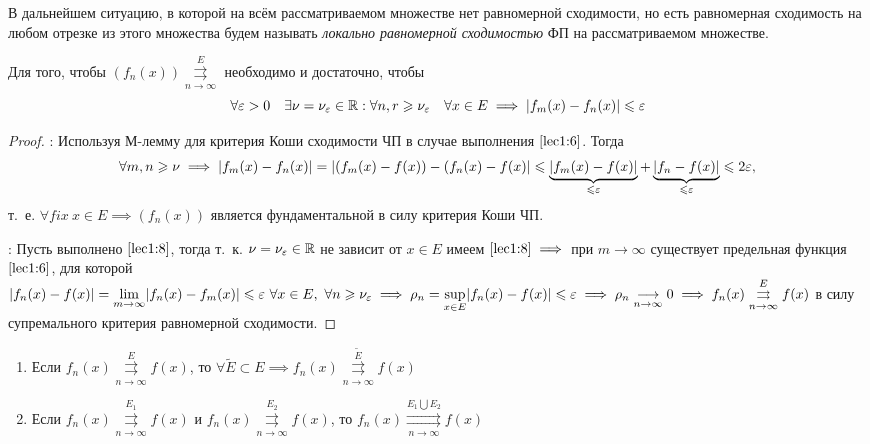 \documentclass[../../main.tex]{subfiles}
\begin{document}
В дальнейшем ситуацию, в которой на всём рассматриваемом 
множестве нет равномерной сходимости, но есть равномерная 
сходимость на любом отрезке из этого множества будем называть 
\emph{локально равномерной сходимостью} ФП на рассматриваемом множестве.

\begin{thm}
Для того, чтобы $(f_n(x)) \overset{E}
{\underset{n \to \infty}\rightrightarrows}$ необходимо и достаточно, 
чтобы 
\begin{equation}
\label{lec1:8}
\forall \varepsilon > 0 \quad \exists \nu=\nu_\varepsilon \in \mathbb{R} :
\forall n,r \geqslant \nu_\varepsilon \quad \forall x \in E \implies 
|f_m(x) - f_n(x)| \leqslant \varepsilon
\end{equation}
\end{thm}	

\begin{proof}
\;

\nec: Используя М-лемму для критерия Коши сходимости ЧП 
в случае выполнения $\eqref{lec1:6}$. Тогда
\[\forall m, n \geqslant \nu \implies |f_m(x) - f_n(x)| = 
|(f_m(x) - f(x)) - (f_n(x) - f(x)| \leqslant 
\underbrace{|f_m(x) - f(x)|}_{\leqslant \varepsilon} + 
\underbrace{|f_n - f(x)|}_{\leqslant \varepsilon} \leqslant  2\varepsilon,\] т.~е. 
$\forall fix \ x \in E \implies (f_n(x))$ 
является фундаментальной в силу критерия Коши ЧП.

\suff: Пусть выполнено $\eqref{lec1:8}$, тогда т.~к. $\nu=\nu_\varepsilon \in \mathbb{R}$
не зависит от $x \in E$ имеем $\eqref{lec1:8} \implies$ при $m \to \infty$ 
существует предельная функция 
$\eqref{lec1:6}$, для которой $|f_n(x) - f(x)| = 
\underset{m \to \infty}{\lim} |f_n(x) - f_m(x)| \leq  \eps \ 
\forall x \in E,\ \forall n \geq \nu_\eps \implies \rho_n = 
\underset{x \in E}{\sup} |f_n(x) - f(x)| \leq \eps \implies 
\rho_n \underset{n \to \infty}{\longrightarrow} 0 \implies
f_n(x) \overset{E}
{\underset{n \to \infty}\rightrightarrows} f(x)$
в силу супремального критерия равномерной сходимости. 
\end{proof}	

\begin{rem}
	\;
	\begin{enumerate}
		\item Если $f_n(x) \overset{E}
{\underset{n \to \infty}\rightrightarrows} f(x)$, то 
$\forall \widetilde{E} \subset E \implies f_n(x) \overset{\widetilde{E}}
{\underset{n \to \infty}\rightrightarrows} f(x)$
		\item Если $f_n(x) \overset{E_1}
		{\underset{n \to \infty}\rightrightarrows} f(x)$ и 
		$f_n(x) \overset{E_2}
		{\underset{n \to \infty}\rightrightarrows} f(x)$, то
		$f_n(x) \overset{E_1 \bigcup E_2}
		{\underset{n \to \infty}\rightrightarrows} f(x)$
	\end{enumerate}
\end{rem}	
\end{document}
